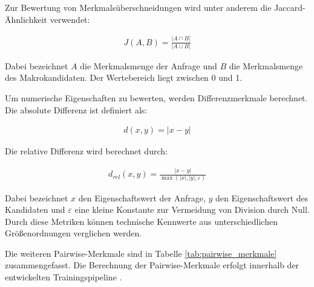 Zur Bewertung von Merkmalsüberschneidungen wird unter anderem die Jaccard-Ähnlichkeit verwendet:

\begin{align}
    J(A,B) = \frac{|A \cap B|} {|A \cup B|}
\end{align}

Dabei bezeichnet $A$ die Merkmalsmenge der Anfrage und $B$ die Merkmalsmenge des Makrokandidaten. Der Wertebereich liegt zwischen 0 und 1.

Um numerische Eigenschaften zu bewerten, werden Differenzmerkmale berechnet. Die absolute Differenz ist definiert als:

\begin{align}
    d(x,y) = |x-y|
\end{align}

Die relative Differenz wird berechnet durch:

\begin{align}
    d_{rel}(x,y) = \frac{|x-y|} {\max(|x|,|y|,\varepsilon)}
\end{align}

Dabei bezeichnet $x$ den Eigenschaftswert der Anfrage, $y$ den Eigenschaftswert des Kandidaten und $\varepsilon$ eine kleine Konstante zur Vermeidung von Division durch Null. Durch diese Metriken können technische Kennwerte aus unterschiedlichen Größenordnungen verglichen werden.

Die weiteren Pairwise-Merkmale sind in Tabelle \ref{tab:pairwise_merkmale} zusammengefasst. 
Die Berechnung der Pairwise-Merkmale erfolgt innerhalb der entwickelten Trainingspipeline \parencite{srcStep931}.

